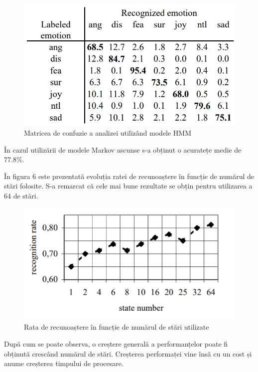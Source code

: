 \documentclass[9pt,shortpaper,twoside,web]{ieeecolor}
\begin{document}
\begin{figure}[htb]
\includegraphics[width=0.8\columnwidth]{res/fig/HMM}
\caption{Matricea de confuzie a analizei utilizând modele HMM \cite{b8}}
\label{fig5}
\end{figure}

În cazul utilizării de modele Markov ascunse s-a obținut o acuratețe medie de $77.8\%$.

În figura 6 este prezentată evoluția ratei de recunoaștere în funcție de numărul de stări folosite. S-a remarcat că cele mai bune rezultate se obțin pentru utilizarea a 64 de stări. 

\begin{figure}[htb]
\includegraphics[width=\columnwidth]{res/fig/rata-de-recunoastere-in-functie-de-numarul-de-stari}
\caption{Rata de recunoaștere în funcție de numărul de stări utilizate \cite{b8}}
\label{fig6}
\end{figure}

După cum se poate observa, o creștere generală a performanțelor poate fi obținută crescând numărul de stări. Creșterea performaței vine însă cu un cost și anume creșterea timpului de procesare.
\end{document}
